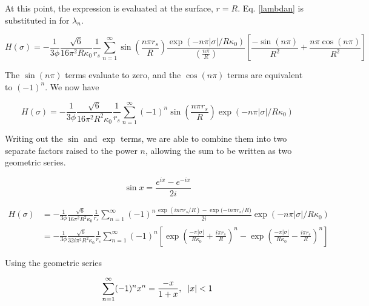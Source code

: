 \documentclass[onecolumn]{aastex63}
\begin{document}
\noindent At this point, the expression is evaluated at the surface, $r=R$. Eq. \ref{lambdan} is substituted in for $\lambda_n$.

\begin{equation}
    H(\sigma) = - \frac{1}{3 \phi} \frac{\sqrt{6}}{16 \pi^2 R \kappa_0} \frac{1}{r_s} \sum_{n=1}^{\infty} \sin{\left(\frac{n\pi r_s}{R}\right)} \frac{\exp{(-n \pi |\sigma|/R\kappa_0)}}{\left(\frac{n\pi}{R}\right)} \left[ \frac{-\sin(n \pi)}{R^2} + \frac{n \pi \cos(n \pi)}{R^2}\right]
\end{equation}

\noindent The $\sin(n\pi)$ terms evaluate to zero, and the $\cos(n\pi)$ terms are equivalent to $(-1)^n$. We now have

\begin{equation}
    H(\sigma) = - \frac{1}{3 \phi} \frac{\sqrt{6}}{16 \pi^2 R^2 \kappa_0} \frac{1}{r_s} \sum_{n=1}^{\infty} (-1)^n \sin{\left(\frac{n\pi r_s}{R}\right)} \exp{(-n \pi |\sigma|/R\kappa_0)}
\end{equation}

Writing out the $\sin$ and $\exp$ terms, we are able to combine them into two separate factors raised to the power $n$, allowing the sum to be written as two geometric series.

\begin{equation}
    \sin{x} = \frac{e^{ix}-e^{-ix}}{2i}
\end{equation}

\begin{equation}
    \begin{split}
        H(\sigma) &= - \frac{1}{3 \phi} \frac{\sqrt{6}}{16 \pi^2 R^2 \kappa_0} \frac{1}{r_s} \sum_{n=1}^{\infty} (-1)^n \frac{\exp{(in\pi r_s / R)}-\exp{(-in\pi r_s/R})}{2i} \exp{(-n \pi |\sigma|/R\kappa_0)} \\
        &= - \frac{1}{3 \phi} \frac{\sqrt{6}}{32 i \pi^2 R^2 \kappa_0} \frac{1}{r_s} \sum_{n=1}^{\infty} (-1)^n \left[ \exp{\left(\frac{-\pi |\sigma|}{R\kappa_0} + \frac{i\pi r_s}{R}\right)^n}-\exp{\left(\frac{-\pi |\sigma|}{R\kappa_0} - \frac{i\pi r_s}{R}\right)^n}\right]
    \end{split}
\end{equation}

\noindent Using the geometric series

\begin{equation}
    \sum_{n=1}^{\infty}(-1)^nx^n = \frac{-x}{1+x}, \hspace{0.2cm} |x| < 1
\end{equation}
\end{document}
